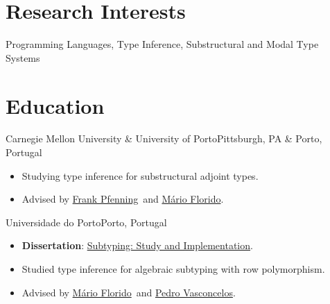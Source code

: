 \documentclass[12pt,a4paper]{moderncv}
\begin{document}
\makecvtitle%

\vspace*{-2em}%

\newcommand{\florido}{\href{https://liacc.fe.up.pt/member/amf}{Mário Florido}}
\newcommand{\vasconcelos}{\href{https://www.dcc.fc.up.pt/~pbv/}{Pedro Vasconcelos}}
\newcommand{\pfenning}{\href{https://www.cs.cmu.edu/~fp/}{Frank Pfenning}}


\section{Research Interests}

Programming Languages, Type Inference, Substructural and Modal Type Systems


\section{Education}

    {Carnegie Mellon University \& University of Porto}{Pittsburgh, PA \& Porto, Portugal}{}{
    \begin{itemize}[noitemsep]
        \item[--] Studying type inference for substructural adjoint types.
        \item[--] Advised by \pfenning\ and \florido.
    \end{itemize}}

    {Universidade do Porto}{Porto, Portugal}{}{
        \begin{itemize}[noitemsep]
            \item[--] \textbf{Dissertation}: \href{https://hdl.handle.net/10216/156497}{Subtyping: Study and Implementation}.
            \item[--] Studied type inference for algebraic subtyping with row polymorphism.
            \item[--] Advised by \florido\ and \vasconcelos.
        \end{itemize}}
\end{document}
